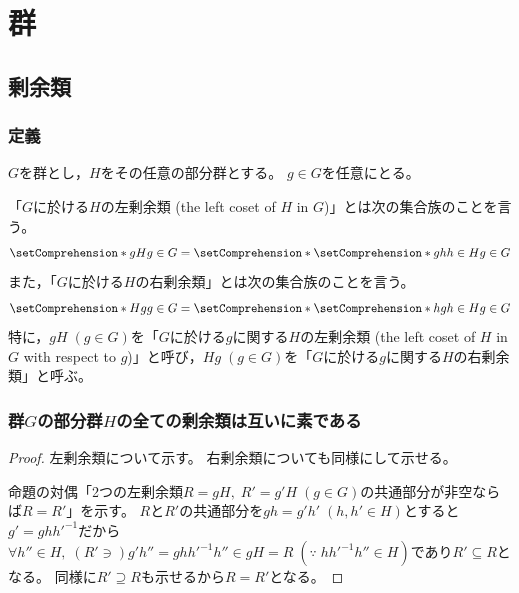 \chapter{群}
    \section{剰余類}
        \subsection{定義}
            $G$を群とし，$H$をその任意の部分群とする。
            $g\in G$を任意にとる。
            \par
            「$G$に於ける$H$の左剰余類 (the left coset of $H$ in $G$)」とは次の集合族のことを言う。
            \[ \setComprehension*{gH}{g \in G} = \setComprehension*{\setComprehension*{gh}{h \in H}}{g \in G} \]
            また，「$G$に於ける$H$の右剰余類」とは次の集合族のことを言う。
            \[ \setComprehension*{Hg}{g \in G} = \setComprehension*{\setComprehension*{hg}{h \in H}}{g \in G} \]
            特に，$gH\;(g \in G)$を「$G$に於ける$g$に関する$H$の左剰余類 (the left coset of $H$ in $G$ with respect to $g$)」と呼び，$Hg\;(g \in G)$を「$G$に於ける$g$に関する$H$の右剰余類」と呼ぶ。
        \subsection{群\texorpdfstring{$G$}{G}の部分群\texorpdfstring{$H$}{H}の全ての剰余類は互いに素である}
            \begin{proof}
                \quad\par
                左剰余類について示す。
                右剰余類についても同様にして示せる。
                \par
                命題の対偶「2つの左剰余類$R=gH,\;R'=g'H\;(g\in G)$の共通部分が非空ならば$R=R'$」を示す。
                $R$と$R'$の共通部分を$gh = g'h'\;(h,h'\in H)$とすると$g' = ghh'^{-1}$だから$\forall h'' \in H,\;(R' \ni) g'h'' = ghh'^{-1}h'' \in gH = R\;(\because\;hh'^{-1}h'' \in H)$であり$R'\subseteq R$となる。
                同様に$R' \supseteq R$も示せるから$R=R'$となる。
            \end{proof}
